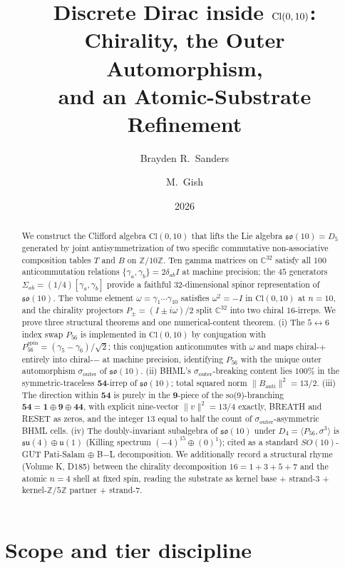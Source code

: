 \documentclass[11pt,reqno]{amsart}
\title[Discrete Dirac inside $\Cl(0, 10)$]
  {Discrete Dirac inside $\Cl(0, 10)$:\\
   Chirality, the Outer Automorphism,\\
   and an Atomic-Substrate Refinement}
\author{Brayden R.\ Sanders}
\author{M.\ Gish}
\date{2026}
\theoremstyle{definition}
\newcommand{\Z}{\mathbb{Z}}
\newcommand{\C}{\mathbb{C}}
\newcommand{\so}{\mathfrak{so}}
\newcommand{\su}{\mathfrak{su}}
\newcommand{\uone}{\mathfrak{u}}
\newcommand{\Cl}{\mathrm{Cl}}
\newcommand{\TSML}{T}
\newcommand{\BHML}{B}
\newcommand{\Psix}{P_{56}}
\newcommand{\Psixspin}{P_{56}^{\mathrm{spin}}}
\newcommand{\sout}{\sigma_{\mathrm{outer}}}
\begin{document}
\begin{abstract}
We construct the Clifford algebra $\Cl(0, 10)$ that lifts the
Lie algebra $\so(10) = D_5$ generated by joint antisymmetrization
of two specific commutative non-associative composition tables
$\TSML$ and $\BHML$ on $\Z/10\Z$. Ten gamma matrices on $\C^{32}$
satisfy all $100$ anticommutation relations $\{\gamma_a, \gamma_b\}
= 2\delta_{ab} I$ at machine precision; the $45$ generators
$\Sigma_{ab} = (1/4)[\gamma_a, \gamma_b]$ provide a faithful
$32$-dimensional spinor representation of $\so(10)$. The volume
element $\omega = \gamma_1 \cdots \gamma_{10}$ satisfies $\omega^2
= -I$ in $\Cl(0, 10)$ at $n=10$, and the chirality projectors
$P_\pm = (I \pm i\omega)/2$ split $\C^{32}$ into two chiral
$16$-irreps. We prove three structural theorems and one
numerical-content theorem. (i) The $5\!\leftrightarrow\!6$ index
swap $\Psix$ is implemented in $\Cl(0, 10)$ by conjugation with
$\Psixspin = (\gamma_5 - \gamma_6)/\sqrt{2}$; this conjugation
anticommutes with $\omega$ and maps chiral-$+$ entirely into
chiral-$-$ at machine precision, identifying $\Psix$ with the
unique outer automorphism $\sout$ of $\so(10)$. (ii) BHML's
$\sout$-breaking content lies $100\%$ in the symmetric-traceless
$\mathbf{54}$-irrep of $\so(10)$; total squared norm $\|B_{\mathrm{anti}}\|^2
= 13/2$. (iii) The direction within $\mathbf{54}$ is purely in the
$\mathbf{9}$-piece of the so(9)-branching $\mathbf{54} = \mathbf{1}
\oplus \mathbf{9} \oplus \mathbf{44}$, with explicit nine-vector
$\|v\|^2 = 13/4$ exactly, BREATH and RESET as zeros, and the integer
$13$ equal to half the count of $\sout$-asymmetric BHML cells.
(iv) The doubly-invariant subalgebra of $\so(10)$ under $D_4 =
\langle \Psix, \sigma^3 \rangle$ is $\su(4) \oplus \uone(1)$
(Killing spectrum $(-4)^{15} \oplus (0)^1$); cited as a standard
$SO(10)$-GUT Pati-Salam $\oplus$ B$-$L decomposition. We additionally
record a structural rhyme (Volume K, D185) between the chirality
decomposition $16 = 1+3+5+7$ and the atomic $n=4$ shell at fixed
spin, reading the substrate as kernel base + strand-$3$ +
kernel-$\Z/5\Z$ partner + strand-$7$.
\end{abstract}

\maketitle

\section*{Scope and tier discipline}
\end{document}
